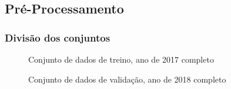 \documentclass[	12pt, Times, openright, twoside, a4paper, english, brazil]{abntex2}
\begin{document}
	    \subsection{Pré-Processamento}
    	    \subsubsection{Divisão dos conjuntos}
    	        \begin{figure}[!ht]
                  \caption{Conjunto de dados de treino, ano de 2017 completo \label{fig:case2_train} }
                \end{figure}
                
                \begin{figure}[!ht]
                  \caption{Conjunto de dados de validação, ano de 2018 completo \label{fig:case2_val} }
                \end{figure}
                
\end{document}
